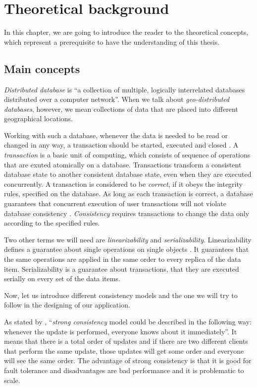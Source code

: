 \chapter{Theoretical background}
\label{Background}

In this chapter, we are going to introduce the reader to the theoretical concepts, which represent a prerequisite to have the understanding of this thesis.

\section{Main concepts}

\textit{Distributed database} is ``a collection of multiple, logically interrelated databases distributed over a computer network''\cite{11}. When we talk about \textit{geo-distributed databases}, however, we mean collections of data that are placed into different geographical locations.

Working with such a database, whenever the data is needed to be read or changed in any way, a transaction should be started, executed and closed . A \textit{transaction} is a basic unit of computing, which consists of sequence of operations that are exuted atomically on a database. Transactions transform a consistent database state to another consistent database state, even when they are executed concurrently. A transaction is considered to be \textit{correct}, if it obeys the integrity rules, specified on the database. As long as each transaction is correct, a database guarantees that concurrent execution of user transactions will not violate database consistency \cite{11}. \textit{Consistency} requires transactions to change the data only according to the specified rules.

Two other terms we will need are \textit{linearizability} and \textit{serializability}. Linearizability defines a guarantee about single operations on single objects \cite{13}. It guarantees that the same operations are applied in the same order to every replica of the data item\cite{12}. Serializability is a guarantee about transactions, that they are executed serially on every set of the data items\cite{12}.

Now, let us introduce different consistency models and the one we will try to follow in the designing of our application. 

As stated by \citet{10}, ``\textit{strong consistency} model could be described in the following way: whenever the update is performed, everyone knows about it immediately''. It means that there is a total order of updates and if there are two different clients that perform the same update, those updates will get some order and everyone will see the same order. The advantage of strong consistency is that it is good for fault tolerance and disadvantages are bad performance and it is problematic to scale.


